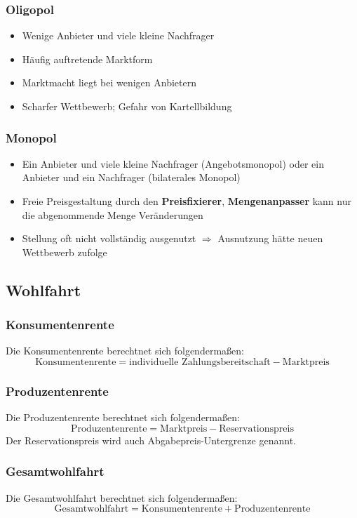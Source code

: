 \documentclass[titlepage,parskip=half]{scrartcl}
\begin{document}
\subsubsection{Oligopol}
\begin{itemize}
    \item Wenige Anbieter und viele kleine Nachfrager
    \item Häufig auftretende Marktform
    \item Marktmacht liegt bei wenigen Anbietern
    \item Scharfer Wettbewerb; Gefahr von Kartellbildung
\end{itemize}

\subsubsection{Monopol}
\begin{itemize}
    \item Ein Anbieter und viele kleine Nachfrager (Angebotsmonopol) oder ein Anbieter und ein Nachfrager (bilaterales Monopol)
    \item Freie Preisgestaltung durch den \textbf{Preisfixierer}, \textbf{Mengenanpasser} kann nur die abgenommende Menge Veränderungen
    \item Stellung oft nicht vollständig ausgenutzt $\Rightarrow$ Ausnutzung hätte neuen Wettbewerb zufolge 
\end{itemize}

\subsection{Wohlfahrt}
\subsubsection{Konsumentenrente}
Die Konsumentenrente berechtnet sich folgendermaßen:
$$
\textrm{Konsumentenrente} = \textrm{individuelle Zahlungsbereitschaft} - \textrm{Marktpreis}
$$

\subsubsection{Produzentenrente}
Die Produzentenrente berechtnet sich folgendermaßen:
$$
\textrm{Produzentenrente} = \textrm{Marktpreis} - \textrm{Reservationspreis}
$$
Der Reservationspreis wird auch Abgabepreis-Untergrenze genannt. 

\subsubsection{Gesamtwohlfahrt}
Die Gesamtwohlfahrt berechtnet sich folgendermaßen:
$$
\textrm{Gesamtwohlfahrt} = \textrm{Konsumentenrente} + \textrm{Produzentenrente}
$$
\end{document}
